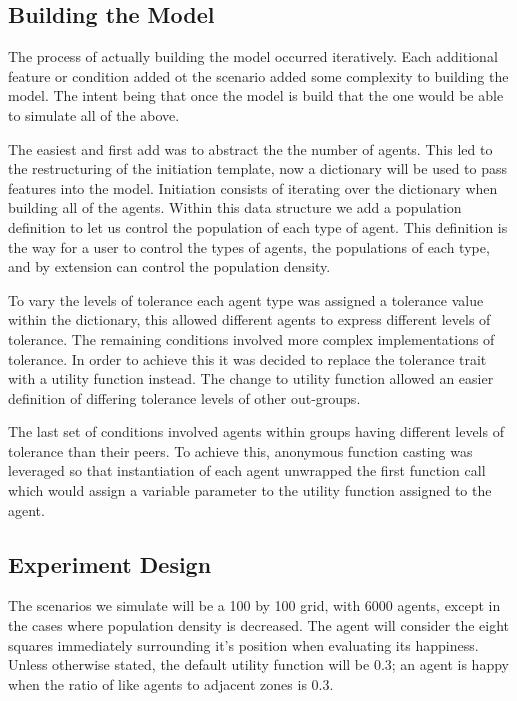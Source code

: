 \documentclass[sigplan,nonacm]{acmart}
\begin{document}
\subsection{Building the Model}

The process of actually building the model occurred iteratively.
Each additional feature or condition added ot the scenario added some complexity to building the model.
The intent being that once the model is build that the one would be able to simulate all of the above.

The easiest and first add was to abstract the the number of agents.
This led to the restructuring of the initiation template, now a dictionary will be used to pass
features into the model.
Initiation consists of iterating over the dictionary when building all of the agents.
Within this data structure we add a population definition to let us control the population of each type of agent.
This definition is the way for a user to control the types of agents, the populations of each type, 
and by extension can control the population density.

To vary the levels of tolerance each agent type was assigned a tolerance value within the dictionary,
this allowed different agents to express different levels of tolerance.
The remaining conditions involved more complex implementations of tolerance.
In order to achieve this it was decided to replace the tolerance trait with a utility function instead.
The change to utility function allowed an easier definition of differing tolerance levels of other out-groups.

The last set of conditions involved agents within groups having different levels of tolerance than their peers.
To achieve this, anonymous function casting was leveraged so that instantiation of each agent
unwrapped the first function call which would assign a variable parameter to the utility function assigned to the agent.

\subsection{Experiment Design}

The scenarios we simulate will be a 100 by 100 grid, with 6000 agents, except in the cases where population density
is decreased. The agent will consider the eight squares immediately surrounding it's position when evaluating its happiness.
Unless otherwise stated, the default utility function will be 0.3; an agent is happy when the ratio of like agents
to adjacent zones is 0.3.
\end{document}
